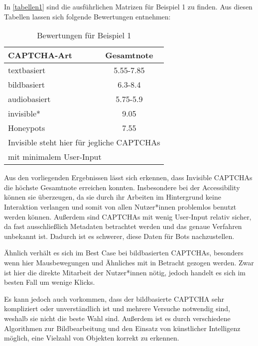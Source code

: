 In \autoref{tabellen1} sind die ausführlichen Matrizen für Beispiel 1 zu finden. 
Aus diesen Tabellen lassen sich folgende Bewertungen entnehmen: 

\begin{table}[h!]
    \caption{Bewertungen für Beispiel 1}
    \begin{center}
        \begin{tabular}{l|c}
            CAPTCHA-Art                       & Gesamtnote \\\hline
            textbasiert            &  5.55-7.85       \\
            bildbasiert                   &  6.3-8.4      \\
            audiobasiert        & 5.75-5.9         \\
            invisible*                      & 9.05         \\
            Honeypots       & 7.55\\
            \multicolumn{2}{l}{\footnotesize * Invisible steht hier für jegliche CAPTCHAs} \\
            \multicolumn{2}{l}{\footnotesize \space \space mit minimalem User-Input}
        \end{tabular}
    \end{center}
\end{table}

Aus den vorliegenden Ergebnissen lässt sich erkennen, dass Invisible \linebreak CAPTCHAs die höchste Gesamtnote erreichen konnten.
Insbesondere bei der Accessibility können sie überzeugen, 
da sie durch ihr Arbeiten im Hintergrund keine Interaktion verlangen und somit von allen Nutzer*innen problemlos benutzt werden können.
Außerdem sind CAPTCHAs mit wenig User-Input relativ sicher, da fast ausschließlich Metadaten betrachtet werden und das genaue Verfahren unbekannt ist.
Dadurch ist es schwerer, diese Daten für Bots nachzustellen.

Ähnlich verhält es sich im Best Case bei bildbasierten CAPTCHAs, besonders wenn hier Mausbewegungen und Ähnliches mit in Betracht gezogen werden.
Zwar ist hier die direkte Mitarbeit der Nutzer*innen nötig, jedoch handelt es sich im besten Fall um wenige Klicks. 

Es kann jedoch auch vorkommen, dass der bildbasierte CAPTCHA sehr kompliziert oder unverständlich ist und mehrere Versuche notwendig sind,
weshalb sie nicht die beste Wahl sind.
Außerdem ist es durch verschiedene Algorithmen zur Bildbearbeitung und den Einsatz von künstlicher Intelligenz möglich,
eine Vielzahl von Objekten korrekt zu erkennen.

